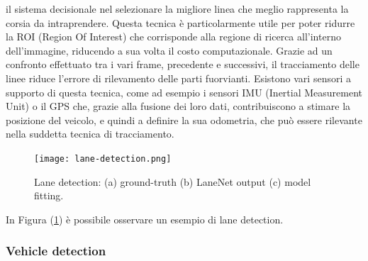 \begin{enumerate}
    il sistema decisionale nel selezionare la migliore linea che meglio rappresenta 
    la corsia da intraprendere. Questa tecnica è particolarmente 
    utile per poter ridurre la ROI (Region Of Interest) che corrisponde 
    alla regione di ricerca all'interno dell'immagine, riducendo a sua volta 
    il costo computazionale. Grazie ad un confronto effettuato tra i 
    vari frame, precedente e successivi, il tracciamento delle linee riduce 
    l'errore di rilevamento delle parti fuorvianti. Esistono vari sensori a 
    supporto di questa tecnica, come ad esempio i sensori IMU (Inertial 
    Measurement Unit) o il GPS che, grazie alla fusione dei loro dati, 
    contribuiscono a stimare la posizione del veicolo, e quindi a definire 
    la sua odometria, che può essere rilevante nella suddetta tecnica di 
    tracciamento.
\end{enumerate}
\begin{figure}
    \centering
    \texttt{[image: lane-detection.png]}
    \centering
    \caption{Lane detection: (a) ground-truth (b) LaneNet \cite{LaneNet} output (c) model fitting.}
    \label{lane-det}
\end{figure}
In Figura (\ref{lane-det}) è possibile osservare un esempio di lane detection.

\subsubsection{Vehicle detection}